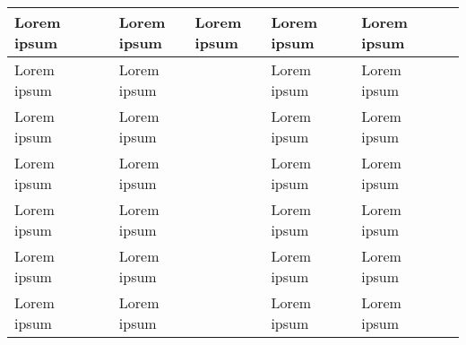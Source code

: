 \documentclass{article}
\begin{document}
\begin{tabularx}{\textwidth}{|X|X|X|X|X|X|X|X|X|X|}
\hline

Lorem ipsum
 &

 &

 &
Lorem ipsum
 &
Lorem ipsum
 &
Lorem ipsum
 &

 &
Lorem ipsum
 &

 &

 \\\hline
Lorem ipsum
 &

 &

 &
Lorem ipsum
 &

 &
Lorem ipsum
 &

 &
Lorem ipsum
 &

 &

 \\\hline
Lorem ipsum
 &

 &

 &
Lorem ipsum
 &

 &
Lorem ipsum
 &

 &
Lorem ipsum
 &

 &

 \\\hline
Lorem ipsum
 &

 &

 &
Lorem ipsum
 &

 &
Lorem ipsum
 &

 &
Lorem ipsum
 &

 &

 \\\hline
Lorem ipsum
 &

 &

 &
Lorem ipsum
 &

 &
Lorem ipsum
 &

 &
Lorem ipsum
 &

 &

 \\\hline
Lorem ipsum
 &

 &

 &
Lorem ipsum
 &

 &
Lorem ipsum
 &

 &
Lorem ipsum
 &

 &

 \\\hline
Lorem ipsum
 &

 &

 &
Lorem ipsum
 &

 &
Lorem ipsum
 &

 &
Lorem ipsum
 &


\end{tabularx}
\end{document}
